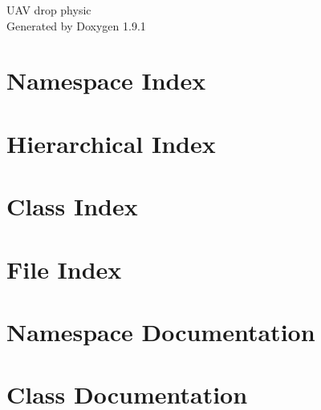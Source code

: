 \let\mypdfximage\pdfximage\def\pdfximage{\immediate\mypdfximage}\documentclass[twoside]{book}
\newcommand{\+}{\discretionary{\mbox{\scriptsize$\hookleftarrow$}}{}{}}
\newcommand{\clearemptydoublepage}{%
  \newpage{\pagestyle{empty}\cleardoublepage}%
}
\begin{document}
\raggedbottom

\hypersetup{pageanchor=false,
             bookmarksnumbered=true,
             pdfencoding=unicode
            }
\begin{titlepage}
\vspace*{7cm}
\begin{center}%
{\Large UAV drop physic }\\
\vspace*{1cm}
{\large Generated by Doxygen 1.9.1}\\
\end{center}
\end{titlepage}
\clearemptydoublepage
{}
\tableofcontents
\clearemptydoublepage
{}
\hypersetup{pageanchor=true}

\chapter{Namespace Index}

\chapter{Hierarchical Index}

\chapter{Class Index}

\chapter{File Index}

\chapter{Namespace Documentation}

\chapter{Class Documentation}





























\end{document}
